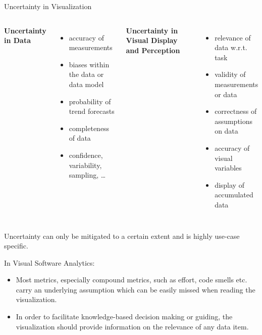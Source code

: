 \documentclass[aspectratio=169,10pt,english]{beamer}
\begin{document}
\begin{frame}[t]{Uncertainty in Visualization}

    \begin{columns}[T,onlytextwidth]

    
        \textbf{Uncertainty in Data}
        \begin{itemize}
            \item accuracy of measurements
            \item biases within the data or data model
            \item probability of trend forecasts
            \item completeness of data
            \item confidence, variability, sampling, \ldots
        \end{itemize}


	    \textbf{Uncertainty in Visual Display and Perception}
        \begin{itemize}
            \item relevance of data w.r.t. task
            \item validity of measurements or data
            \item correctness of assumptions on data
            \item accuracy of visual variables
            \item display of accumulated data
        \end{itemize}
    	
    \end{columns}
    
    \bigskip
    \pause
    
    Uncertainty can only be mitigated to a certain extent and is highly use-case specific.
    \medskip
    
    In Visual Software Analytics:

    \begin{itemize}
        \item Most metrics, especially compound metrics, such as effort, code smells etc. carry an underlying assumption which can be easily missed when reading the visualization.
        \item In order to facilitate knowledge-based decision making or guiding, the visualization should provide information on the relevance of any data item.    
    \end{itemize}

\end{frame} 
\end{document}
